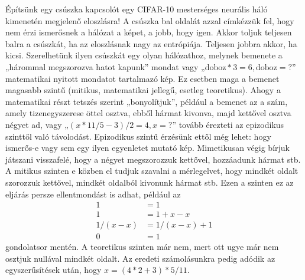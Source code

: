 \documentclass[a4paper]{article}
\begin{document}
Építsünk egy csúszka kapcsolót egy CIFAR-10 mesterséges neurális háló kimenetén megjelenő eloszlásra! A csúszka bal oldalát azzal címkézzük fel, hogy nem érzi ismerősnek a hálózat a képet, a jobb, hogy igen. Akkor toljuk teljesen balra a csúszkát, ha az eloszlásnak nagy az entrópiája. Teljesen jobbra akkor, ha kicsi. Szerelhetünk ilyen csúszkát egy olyan hálózathoz, melynek bemenete a „hárommal megszorozva hatot kapunk” mondat vagy „$\text{doboz}*3=6, \text{doboz}=\text{?}$” matematikai nyitott mondatot tartalmazó kép. Ez esetben maga a bemenet magasabb szintű (mitikus, matematikai jellegű, esetleg teoretikus). Ahogy a matematikai részt tetszés szerint „bonyolítjuk”, például a bemenet az a szám, amely tizenegyszerese öttel osztva, ebből hármat kivonva, majd kettővel osztva négyet ad, vagy „$(x*11/5-3)/2=4, x=\text{?}$” tovább érezteti az epizodikus szinttől való távolodást. Epizodikus szintű érzésünk ettől még lehet: hogy ismerős-e vagy sem egy ilyen egyenletet mutató kép. Mimetikusan végig bírjuk játszani visszafelé, hogy a négyet megszorozzuk kettővel, hozzáadunk hármat stb. A mitikus szinten e közben el tudjuk szavalni a mérlegelvet, hogy mindkét oldalt szorozzuk kettővel, mindkét oldalból kivonunk hármat stb. Ezen a szinten ez az eljárás persze ellentmondást is adhat, például az 
\begin{align*} 
1&=1 \\
1&=1+x-x \\ 
1/(x-x)&=1/(x-x) +1\\ 
0&=1 
\end{align*}
gondolatsor mentén. A teoretikus szinten már nem, mert ott ugye már nem osztjuk nullával mindkét oldalt. Az eredeti számolásunkra pedig adódik az egyszerűsítések után, hogy $x=(4*2+3)*5/11$.
\end{document}

